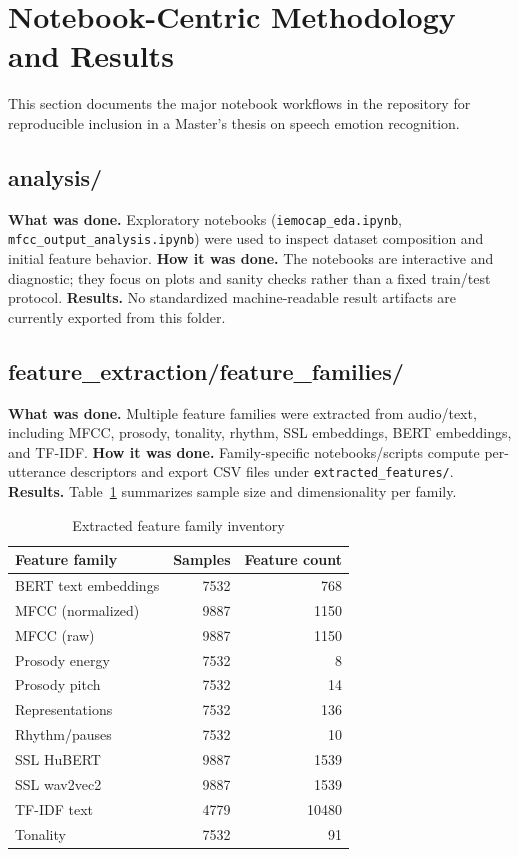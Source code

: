 \section{Notebook-Centric Methodology and Results}
This section documents the major notebook workflows in the repository for reproducible inclusion in a Master's thesis on speech emotion recognition.
\subsection{analysis/}
\textbf{What was done.} Exploratory notebooks (\texttt{iemocap\_eda.ipynb}, \texttt{mfcc\_output\_analysis.ipynb}) were used to inspect dataset composition and initial feature behavior.
\textbf{How it was done.} The notebooks are interactive and diagnostic; they focus on plots and sanity checks rather than a fixed train/test protocol.
\textbf{Results.} No standardized machine-readable result artifacts are currently exported from this folder.
\subsection{feature\_extraction/feature\_families/}
\textbf{What was done.} Multiple feature families were extracted from audio/text, including MFCC, prosody, tonality, rhythm, SSL embeddings, BERT embeddings, and TF-IDF.
\textbf{How it was done.} Family-specific notebooks/scripts compute per-utterance descriptors and export CSV files under \texttt{extracted\_features/}.
\textbf{Results.} Table~\ref{tab:feature_inventory} summarizes sample size and dimensionality per family.
\begin{table}[h]
\centering
\caption{Extracted feature family inventory}
\label{tab:feature_inventory}
\begin{tabular}{lrr}
\hline
Feature family & Samples & Feature count \\
\hline
BERT text embeddings & 7532 & 768 \\
MFCC (normalized) & 9887 & 1150 \\
MFCC (raw) & 9887 & 1150 \\
Prosody energy & 7532 & 8 \\
Prosody pitch & 7532 & 14 \\
Representations & 7532 & 136 \\
Rhythm/pauses & 7532 & 10 \\
SSL HuBERT & 9887 & 1539 \\
SSL wav2vec2 & 9887 & 1539 \\
TF-IDF text & 4779 & 10480 \\
Tonality & 7532 & 91 \\
\hline
\end{tabular}
\end{table}
